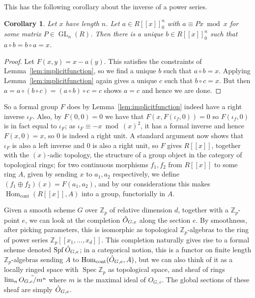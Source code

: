 \documentclass[12pt]{article}
\newcommand{\Z}{\mathbb{Z}}
\DeclareMathOperator{\Hom}{Hom}
\DeclareMathOperator{\Spec}{Spec}
\DeclareMathOperator{\Spf}{Spf}
\DeclareMathOperator{\GL}{GL}
\theoremstyle{plain}
\newtheorem{cor}[thm]{Corollary} %
\theoremstyle{definition}
\theoremstyle{remark}
\begin{document}
This has the following corollary about the inverse of a power series.
\begin{cor}
\label{lem:formalinverse}
Let $x$ have length $n$. Let $a \in R[[x]]_0^n$ with $a \equiv Px \bmod x$ for some matrix $P\in \GL_n(R)$. Then there is a unique $b \in R[[x]]_0^n$ such that $a \circ b = b \circ a = x$.
\end{cor}
\begin{proof}
Let $F(x,y) = x - a(y)$. This satisfies the constraints of Lemma~\ref{lem:implicitfunction}, so we find a unique $b$ such that $a \circ b = x$. Applying Lemma~\ref{lem:implicitfunction} again gives a unique $c$ such that $b \circ c = x$. But then $a = a \circ (b \circ c) = (a \circ b) \circ c = c$ shows $a = c$ and hence we are done.
\end{proof}
So a formal group $F$ does by Lemma~\ref{lem:implicitfunction} indeed have a right inverse $\iota_F$. Also, by $F(0,0) = 0$ we have that $F(x,F(\iota_f,0)) = 0$ so $F(\iota_f,0)$ is in fact equal to $\iota_F$; as $\iota_F \equiv -x \bmod (x)^2$, it has a formal inverse and hence $F(x,0) = x$, so $0$ is indeed a right unit. A standard argument now shows that $\iota_F$ is also a left inverse and $0$ is also a right unit, so $F$ gives $R[[x]]$, together with the $(x)$-adic topology, the structure of a group object in the category of topological rings; for two continuous morphisms $f_1,f_2$ from $R[[x]]$ to some ring $A$, given by sending $x$ to $a_1,a_2$ respectively, we define $(f_1 \oplus f_2)(x) = F(a_1,a_2)$, and by our considerations this makes $\Hom_{\text{cont}}(R[[x]],A)$ into a group, functorially in $A$.

Given a smooth scheme $G$ over $\Z_p$ of relative dimension $d$, together with a $\Z_p$-point $e$, we can look at the completion $\Hat{O}_{G,e}$ along the section $e$. By smoothness, after picking parameters, this is isomorphic as topological $\Z_p$-algebras to the ring of power series $\Z_p[[x_1,\dots,x_d]]$. This completion naturally gives rise to a formal scheme denoted $\Spf \Hat{O}_{G,e}$; in a categorical notion, this is a functor on finite length $\Z_p$-algebras sending $A$ to $\Hom_{\text{cont}}(\Hat{O}_{G,e},A)$, but we can also think of it as a locally ringed space with $\Spec \Z_p$ as topological space, and sheaf of rings $\lim_n \Tilde{O_{G,e}/m^n}$ where $m$ is the maximal ideal of $O_{G,e}$. The global sections of these sheaf are simply $\Hat{O}_{G,e}$. 
\end{document}
